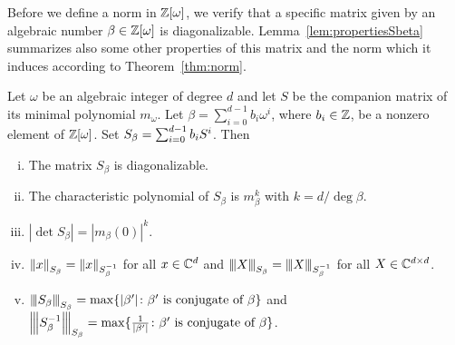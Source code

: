 Before we define a norm in $\mathbb{Z}[\omega]$, we verify that a specific matrix given by an algebraic number $\beta\in\mathbb{Z}[\omega]$ is diagonalizable. Lemma~\ref{lem:propertiesSbeta} summarizes also some other properties of this matrix and the norm which it induces according to Theorem~\ref{thm:norm}.
\begin{lem}
\label{lem:propertiesSbeta}
Let $\omega$ be an algebraic integer of degree $d$ and let $S$ be the companion matrix of its minimal polynomial $m_\omega$. Let $\beta=\sum_{i=0}^{d-1} b_i \omega^i$, where $b_i \in \mathbb{Z}$, be a nonzero element of $\mathbb{Z}[\omega]$. Set $S_\beta=\sum_{i=0}^{d-1} {b}_i S^i$. Then
\begin{enumerate}[i)]
   \item The matrix $S_\beta$ is diagonalizable.
   \item The characteristic polynomial of $S_\beta$ is $m_\beta^k$ with $k=d / \deg \beta$.
   \item $|\det S_\beta|=|m_\beta(0)|^k$.
   \item $\left\lVert x\right\rVert_{S_\beta}=\left\lVert x\right\rVert_{S_\beta^{-1}}$ for all $x \in \mathbb{C}^d$ and ${\left\vert\kern-0.25ex\left\vert\kern-0.25ex\left\vert X\right\vert\kern-0.25ex\right\vert\kern-0.25ex\right\vert}_{S_\beta}={\left\vert\kern-0.25ex\left\vert\kern-0.25ex\left\vert X\right\vert\kern-0.25ex\right\vert\kern-0.25ex\right\vert}_{S_\beta^{-1}}$ for all $X \in \mathbb{C}^{d\times d}$.
   \item ${\left\vert\kern-0.25ex\left\vert\kern-0.25ex\left\vert S_\beta\right\vert\kern-0.25ex\right\vert\kern-0.25ex\right\vert}_{S_\beta}=\max \{|\beta'| \colon \beta' \text{ is conjugate of } \beta\}$ and $ {\left\vert\kern-0.25ex\left\vert\kern-0.25ex\left\vert S_\beta^{-1}\right\vert\kern-0.25ex\right\vert\kern-0.25ex\right\vert}_{S_\beta}=\max \{\frac{1}{|\beta'|} \colon \beta' \text{ is conjugate of } \beta\}$.
\end{enumerate}  
\end{lem}
